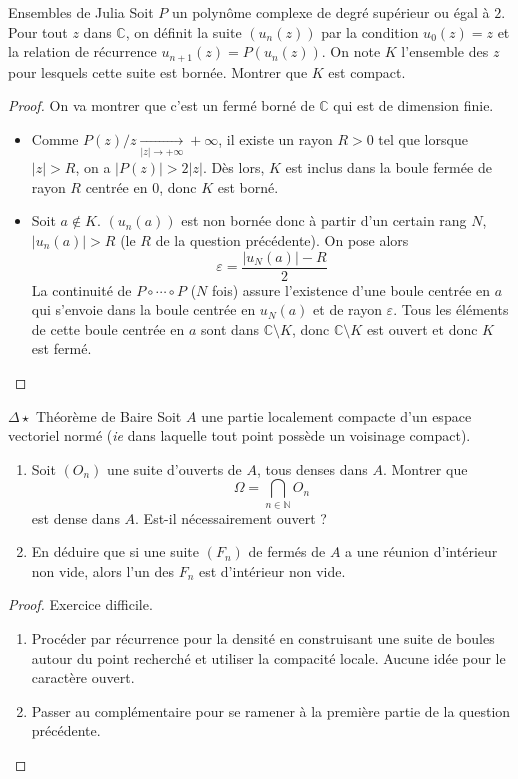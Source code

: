 \documentclass[french,a4paper]{article}
\newcommand{\N}{\mathbb{N}}
\newcommand{\C}{\mathbb{C}}
\theoremstyle{plain}
\theoremstyle{definition}
\theoremstyle{remark}
\begin{document}
\begin{ex}{Ensembles de Julia}
	Soit $P$ un polynôme complexe de degré supérieur ou égal à $2$. Pour tout $z$ dans $\C$, on définit la suite $(u_n(z))$ par la condition $u_0(z)=z$ et la relation de récurrence $u_{n+1}(z)=P(u_n(z))$. On note $K$ l'ensemble des $z$ pour lesquels cette suite est bornée. Montrer que $K$ est compact.
\end{ex}
\begin{proof}
	On va montrer que c'est un fermé borné de $\C$ qui est de dimension finie.
	\begin{itemize}
		\item Comme $P(z)/z\xrightarrow[\lvert z\rvert\to+\infty]{}+\infty$, il existe un rayon $R>0$ tel que lorsque $\lvert z\rvert>R$, on a $\lvert P(z)\rvert>2\lvert z\rvert$. Dès lors, $K$ est inclus dans la boule fermée de rayon $R$ centrée en $0$, donc $K$ est borné.
		\item Soit $a\notin K$. $(u_n(a))$ est non bornée donc à partir d'un certain rang $N$, $\lvert u_n(a)\rvert>R$ (le $R$ de la question précédente). On pose alors $$\varepsilon=\frac{\lvert u_N(a)\rvert -R}{2}$$ La continuité de $P\circ\cdots\circ P$ ($N$ fois) assure l'existence d'une boule centrée en $a$ qui s'envoie dans la boule centrée en $u_N(a)$ et de rayon $\varepsilon$. Tous les éléments de cette boule centrée en $a$ sont dans $\C\setminus K$, donc $\C\setminus K$ est ouvert et donc $K$ est fermé.
	\end{itemize}
\end{proof}

\begin{ex}{$\Delta\star$ Théorème de Baire}
	Soit $A$ une partie localement compacte d'un espace vectoriel normé (\textit{ie} dans laquelle tout point possède un voisinage compact).
	\begin{enumerate}
		\item Soit $(O_n)$ une suite d'ouverts de $A$, tous denses dans $A$. Montrer que $$\Omega=\bigcap_{n\in\N} O_n$$ est dense dans $A$. Est-il nécessairement ouvert ?
		\item En déduire que si une suite $(F_n)$ de fermés de $A$ a une réunion d'intérieur non vide, alors l'un des $F_n$ est d'intérieur non vide.
	\end{enumerate}
\end{ex}
\begin{proof}
	Exercice difficile.
	\begin{enumerate}
		\item Procéder par récurrence pour la densité en construisant une suite de boules autour du point recherché et utiliser la compacité locale. Aucune idée pour le caractère ouvert.
		\item Passer au complémentaire pour se ramener à la première partie de la question précédente.
	\end{enumerate}
\end{proof}
\end{document}
